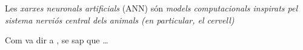 Les \emph{xarxes neuronals artificials} (ANN) són \emph{models computacionals 
inspirats pel sistema nerviós central dels animals (en particular, el cervell)} \autocite{nnpatrec}


Com va dir a \textcite{nnpatrec}, se sap que \dots

